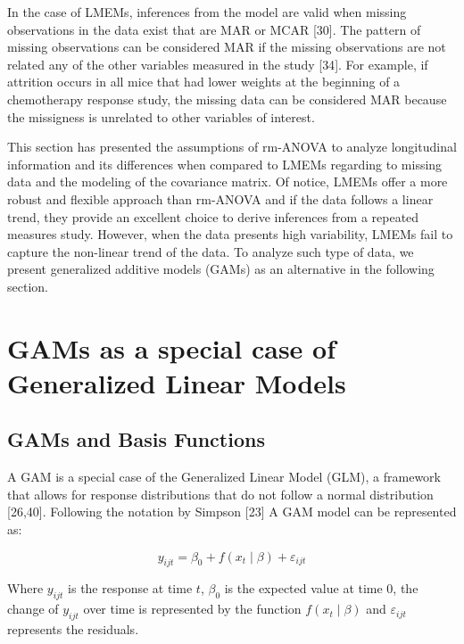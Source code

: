 \documentclass[
]{article}
\begin{document}
In the case of LMEMs, inferences from the model are valid when missing observations in the data exist that are MAR or MCAR {[}30{]}. The pattern of missing observations can be considered MAR if the missing observations are not related any of the other variables measured in the study {[}34{]}. For example, if attrition occurs in all mice that had lower weights at the beginning of a chemotherapy response study, the missing data can be considered MAR because the missigness is unrelated to other variables of interest.

This section has presented the assumptions of rm-ANOVA to analyze longitudinal information and its differences when compared to LMEMs regarding to missing data and the modeling of the covariance matrix. Of notice, LMEMs offer a more robust and flexible approach than rm-ANOVA and if the data follows a linear trend, they provide an excellent choice to derive inferences from a repeated measures study. However, when the data presents high variability, LMEMs fail to capture the non-linear trend of the data. To analyze such type of data, we present generalized additive models (GAMs) as an alternative in the following section.

\hypertarget{gams-as-a-special-case-of-generalized-linear-models}{%
\section{GAMs as a special case of Generalized Linear Models}\label{gams-as-a-special-case-of-generalized-linear-models}}

\hypertarget{gams-and-basis-functions}{%
\subsection{GAMs and Basis Functions}\label{gams-and-basis-functions}}

A GAM is a special case of the Generalized Linear Model (GLM), a framework that allows for response distributions that do not follow a normal distribution {[}26,40{]}. Following the notation by Simpson {[}23{]} A GAM model can be represented as:

\begin{equation}
  y_{ijt}=\beta_0+f(x_t\mid \beta)+\varepsilon_{ijt}
  \label{eq:GAM}
\end{equation}

Where \(y_{ijt}\) is the response at time \(t\), \(\beta_0\) is the expected value at time 0, the change of \(y_{ijt}\) over time is represented by the function \(f(x_t\mid \beta)\) and \(\varepsilon_{ijt}\) represents the residuals.
\end{document}
